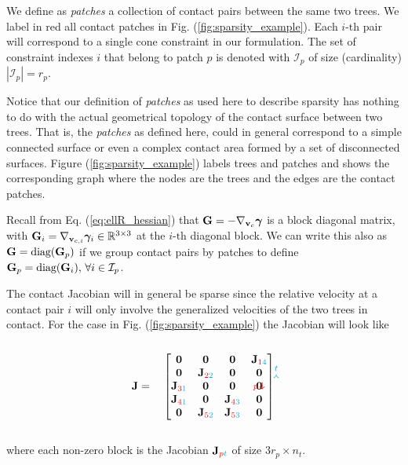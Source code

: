 We define as \textit{patches} a collection of contact pairs between the same two
trees. We label in red all contact patches in Fig. (\ref{fig:sparsity_example}).
Each $i\text{-th}$ pair will correspond to a single cone constraint in our
formulation. The set of constraint indexes $i$ that belong to patch $p$ is
denoted with $\mathcal{I}_p$ of size (cardinality) $|\mathcal{I}_p| = r_p$.

Notice that our definition of \textit{patches} as used here to describe sparsity
has nothing to do with the actual geometrical topology of the contact surface
between two trees. That is, the \textit{patches} as defined here, could in
general correspond to a simple connected surface or even a complex contact area
formed by a set of disconnected surfaces. Figure (\ref{fig:sparsity_example})
labels trees and patches and shows the corresponding graph where the nodes are
the trees and the edges are the contact patches.

Recall from Eq. (\ref{eq:ellR_hessian}) that ${\mathbf{G}} =
-\nabla_{{\mathbf{v}}_c}{\bm\gamma}$ is a block diagonal matrix, with ${\mathbf{G}}_i =
\nabla_{{\mathbf{v}}_{c,i}}{\bm\gamma}_i \in \mathbb{R}^{3\times 3}$ at the $i\text{-th}$
diagonal block. We can write this also as ${\mathbf{G}} = \text{diag}({\mathbf{G}}_p)$ if we
group contact pairs by patches to define ${\mathbf{G}}_p=\text{diag}({\mathbf{G}}_i),
\,\forall i\in\mathcal{I}_p$.

The contact Jacobian will in general be sparse since the relative velocity at a
contact pair $i$ will only involve the generalized velocities of the two trees
in contact. For the case in Fig. (\ref{fig:sparsity_example}) the Jacobian will
look like\\\\
\begin{equation}
	\mf{J}=\quad
	\begin{bmatrix}
		\tikzmark{J_topleft}\mf{0} & 
		\mf{0} & \mf{0} & \mf{J}_{\rr{1}\cc{4}}\tikzmark{J_topright}\\		
		\mf{0} & \mf{J}_{\rr{2}\cc{2}} & \mf{0} & \mf{0}\\
		\mf{J}_{\rr{3}\cc{1}} & \mf{0} & \mf{0} & \mf{0}\\
		\mf{J}_{\rr{4}\cc{1}} & \mf{0} & \mf{J}_{\rr{4}\cc{3}} & \mf{0}\\
		\tikzmark{J_bottomleft}
		\mf{0} & \mf{J}_{\rr{5}\cc{2}} & \mf{J}_{\rr{5}\cc{3}} & \mf{0}		
	\end{bmatrix}
\tikz[overlay,remember picture] {
	\draw[->,thick,color=cyan]
  ([yshift=3ex]J_topleft) -- ([yshift=3ex]J_topright) node[midway,above]
  {\scriptsize $t$}; 
  \draw[->,thick,color=red]
  ([yshift=1.5ex,xshift=-3ex]J_topleft) -- ([xshift=-3ex]J_bottomleft)
  node[near end,left] {\scriptsize $p$};}	
\end{equation}
\\
where each non-zero block is the Jacobian ${\mathbf{J}}_{{\color{red}p}{\color{cyan}t}}$ of size
$3r_p\times n_t$.

